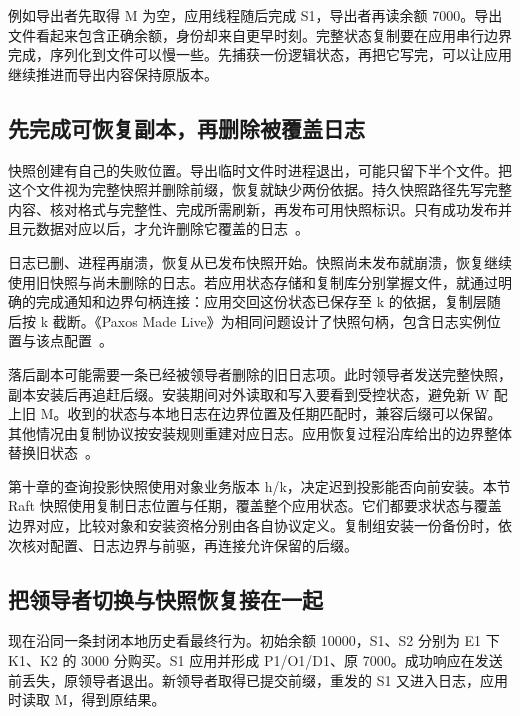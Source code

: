 例如导出者先取得 M 为空，应用线程随后完成 S1，导出者再读余额 7000。导出文件看起来包含正确余额，身份却来自更早时刻。完整状态复制要在应用串行边界完成，序列化到文件可以慢一些。先捕获一份逻辑状态，再把它写完，可以让应用继续推进而导出内容保持原版本。


\subsection*{先完成可恢复副本，再删除被覆盖日志}

快照创建有自己的失败位置。导出临时文件时进程退出，可能只留下半个文件。把这个文件视为完整快照并删除前缀，恢复就缺少两份依据。持久快照路径先写完整内容、核对格式与完整性、完成所需刷新，再发布可用快照标识。只有成功发布并且元数据对应以后，才允许删除它覆盖的日志~\cite{paxos-made-live}。

日志已删、进程再崩溃，恢复从已发布快照开始。快照尚未发布就崩溃，恢复继续使用旧快照与尚未删除的日志。若应用状态存储和复制库分别掌握文件，就通过明确的完成通知和边界句柄连接：应用交回这份状态已保存至 k 的依据，复制层随后按 k 截断。《Paxos Made Live》为相同问题设计了快照句柄，包含日志实例位置与该点配置~\cite{paxos-made-live}。


落后副本可能需要一条已经被领导者删除的旧日志项。此时领导者发送完整快照，副本安装后再追赶后缀。安装期间对外读取和写入要看到受控状态，避免新 W 配上旧 M。收到的状态与本地日志在边界位置及任期匹配时，兼容后缀可以保留。其他情况由复制协议按安装规则重建对应日志。应用恢复过程沿库给出的边界整体替换旧状态~\cite{raft}。

第十章的查询投影快照使用对象业务版本 h/k，决定迟到投影能否向前安装。本节 Raft 快照使用复制日志位置与任期，覆盖整个应用状态。它们都要求状态与覆盖边界对应，比较对象和安装资格分别由各自协议定义。复制组安装一份备份时，依次核对配置、日志边界与前驱，再连接允许保留的后缀。

\subsection*{把领导者切换与快照恢复接在一起}

现在沿同一条封闭本地历史看最终行为。初始余额 10000，S1、S2 分别为 E1 下 K1、K2 的 3000 分购买。S1 应用并形成 P1/O1/D1、原 7000。成功响应在发送前丢失，原领导者退出。新领导者取得已提交前缀，重发的 S1 又进入日志，应用时读取 M，得到原结果。


